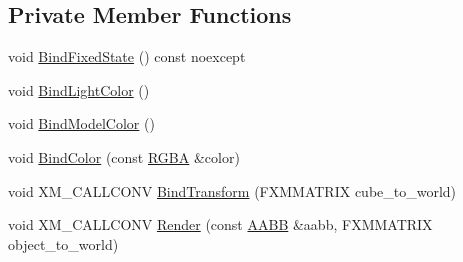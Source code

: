 \subsection*{Private Member Functions}
\begin{DoxyCompactItemize}
\item 
void \mbox{\hyperlink{classmage_1_1rendering_1_1_bounding_volume_pass_a117de59e78f7219b10795678eeacff34}{Bind\+Fixed\+State}} () const noexcept
\item 
void \mbox{\hyperlink{classmage_1_1rendering_1_1_bounding_volume_pass_a0bf1d814b3ebb56a6076bfb1cb27de8d}{Bind\+Light\+Color}} ()
\item 
void \mbox{\hyperlink{classmage_1_1rendering_1_1_bounding_volume_pass_a5b889af6dc3c58aecdd619dee69feca0}{Bind\+Model\+Color}} ()
\item 
void \mbox{\hyperlink{classmage_1_1rendering_1_1_bounding_volume_pass_a52c5852cfc290c5d07059537a26b71ea}{Bind\+Color}} (const \mbox{\hyperlink{structmage_1_1_r_g_b_a}{R\+G\+BA}} \&color)
\item 
void X\+M\+\_\+\+C\+A\+L\+L\+C\+O\+NV \mbox{\hyperlink{classmage_1_1rendering_1_1_bounding_volume_pass_aa43435b88597d4d9a59047f4558c4bab}{Bind\+Transform}} (F\+X\+M\+M\+A\+T\+R\+IX cube\+\_\+to\+\_\+world)
\item 
void X\+M\+\_\+\+C\+A\+L\+L\+C\+O\+NV \mbox{\hyperlink{classmage_1_1rendering_1_1_bounding_volume_pass_aad91ae836c4c556ec7ec3f477c139e6e}{Render}} (const \mbox{\hyperlink{classmage_1_1_a_a_b_b}{A\+A\+BB}} \&aabb, F\+X\+M\+M\+A\+T\+R\+IX object\+\_\+to\+\_\+world)
\end{DoxyCompactItemize}
